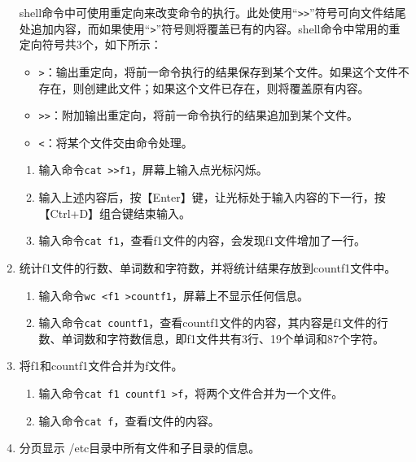\begin{enumerate}
    shell命令中可使用重定向来改变命令的执行。此处使用“\verb|>>|”符号可向文件结尾处追加内容，而如果使用“\verb|>|”符号则将覆盖已有的内容。shell命令中常用的重定向符号共3个，如下所示：
    \begin{itemize}
      \item \verb|>|：输出重定向，将前一命令执行的结果保存到某个文件。如果这个文件不存在，则创建此文件；如果这个文件已存在，则将覆盖原有内容。
      \item \verb|>>|：附加输出重定向，将前一命令执行的结果追加到某个文件。
      \item \verb|<|：将某个文件交由命令处理。
    \end{itemize}
    \begin{enumerate}
      \item 输入命令\verb|cat >>f1|，屏幕上输入点光标闪烁。
      \item 输入上述内容后，按【Enter】键，让光标处于输入内容的下一行，按【Ctrl+D】组合键结束输入。
      \item 输入命令\verb|cat f1|，查看f1文件的内容，会发现f1文件增加了一行。
    \end{enumerate}
  \item 统计f1文件的行数、单词数和字符数，并将统计结果存放到countf1文件中。
    \begin{enumerate}
      \item 输入命令\verb|wc <f1 >countf1|，屏幕上不显示任何信息。
      \item 输入命令\verb|cat countf1|，查看countf1文件的内容，其内容是f1文件的行数、单词数和字符数信息，即f1文件共有3行、19个单词和87个字符。
    \end{enumerate}
  \item 将f1和countf1文件合并为f文件。
    \begin{enumerate}
      \item 输入命令\verb|cat f1 countf1 >f|，将两个文件合并为一个文件。
      \item 输入命令\verb|cat f|，查看f文件的内容。
    \end{enumerate}
  \item 分页显示 /etc目录中所有文件和子目录的信息。


\end{enumerate}
